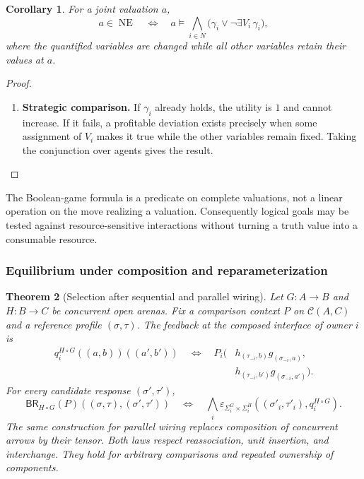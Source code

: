 \documentclass[11pt,a4paper]{article}
\numberwithin{equation}{section}
\newtheorem{theorem}{Theorem}[section]
\newtheorem{corollary}[theorem]{Corollary}
\theoremstyle{definition}
\theoremstyle{remark}
\theoremstyle{plain}
\begin{document}
\begin{corollary}
\label{cor:egt-boolean}
For a joint valuation $a$,
\[
 a\in\operatorname{NE}
 \quad\Longleftrightarrow\quad
 a\models\bigwedge_{i\in N}
       \bigl(\gamma_i\lor\neg\exists V_i\,\gamma_i\bigr),
\]
where the quantified variables are changed while all other variables retain
their values at $a$.
\end{corollary}
\begin{proof}
\leavevmode
\begin{enumerate}[label=\textup{(\arabic*)},leftmargin=*,itemsep=4pt,topsep=3pt]
  \item \textbf{Strategic comparison.} If $\gamma_i$ already holds, the utility is $1$ and cannot increase. If it
fails, a profitable deviation exists precisely when some assignment of
$V_i$ makes it true while the other variables remain fixed. Taking the
conjunction over agents gives the result.
\end{enumerate}
\end{proof}

The Boolean-game formula is a predicate on complete valuations, not
a linear operation on the move realizing a valuation. Consequently logical
goals may be tested against resource-sensitive interactions without
turning a truth value into a consumable resource.

\subsubsection{Equilibrium under composition and reparameterization}

\begin{theorem}[Selection after sequential and parallel wiring]
\label{thm:cgt-composite-selection}
Let $G:A\to B$ and $H:B\to C$ be concurrent open arenas. Fix a
comparison context $P$ on $\mathcal C(A,C)$ and a reference profile
$(\sigma,\tau)$. The feedback at the composed interface of owner $i$ is
\begin{align*}
 q_i^{H\circ G}((a,b))((a',b'))
 \quad\Longleftrightarrow\quad
 P_i\bigl(&h_{(\tau_{-i},b)}g_{(\sigma_{-i},a)},\\
         &h_{(\tau_{-i},b')}g_{(\sigma_{-i},a')}\bigr).
\end{align*}
For every candidate response $(\sigma',\tau')$,
\[
 \mathsf{BR}_{H\circ G}(P)((\sigma,\tau),(\sigma',\tau'))
 \quad\Longleftrightarrow\quad
 \bigwedge_i
 \varepsilon_{\Sigma_i^G\times\Sigma_i^H}
       ((\sigma'_i,\tau'_i),q_i^{H\circ G}).
\]
The same construction for parallel wiring replaces composition of
concurrent arrows by their tensor. Both laws respect reassociation,
unit insertion, and interchange. They hold for arbitrary comparisons
and repeated ownership of components.
\end{theorem}
\end{document}
